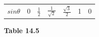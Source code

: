 {{\begin{center}
\begin{tabular}[t]{|l|l|l|l|l|l|l|}
                  $sin\theta $
                 &
        0 &
                  $\frac{1}{2}$
                 &
                  $\frac{1}{\sqrt{2}}$
                 &
                  $\frac{\sqrt{3}}{2}$
                 &
        1 &
        0%
     \tabularnewline\cline{1-1}\cline{2-2}\cline{3-3}\cline{4-4}\cline{5-5}\cline{6-6}\cline{7-7}
    \end{tabular}
      \end{center}
    \begin{center}{\small\bfseries Table 14.5}\end{center}
          }{ %
        \begin{center}
      \label{m39414*id84073}
    \noindent
      \tablelasttail{}
      \begin{xtabular}[t]{|l|l|l|l|l|l|l|}\hline

\end{xtabular}
\end{center}}}
